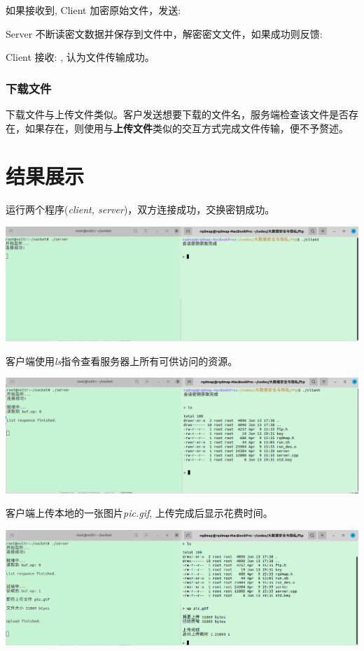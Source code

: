 \documentclass{article}
\begin{document}
\begin{spacing}{2.0}
    \indent \indent 如果接收到, Client 加密原始文件，发送: 

    \indent \indent Server 不断读密文数据并保存到文件中，解密密文文件，如果成功则反馈: 

    \indent \indent Client 接收: , 认为文件传输成功。

    \subsubsection{下载文件} 下载文件与上传文件类似。客户发送想要下载的文件名，服务端检查该文件是否存在，如果存在，则使用与\textbf{上传文件}类似的交互方式完成文件传输，便不予赘述。
        
\section{结果展示}
    运行两个程序(\textit{client, server})，双方连接成功，交换密钥成功。
\begin{center}
    \includegraphics[width=1\textwidth]{pic/1.png}
\end{center} 

    客户端使用\textit{ls}指令查看服务器上所有可供访问的资源。

\begin{center}
    \includegraphics[width=1\textwidth]{pic/2.png}
\end{center} 

    客户端上传本地的一张图片\textit{pic.gif}, 上传完成后显示花费时间。
\begin{center}
    \includegraphics[width=1\textwidth]{pic/3.png}
\end{center} 


\end{spacing}
\end{document}
